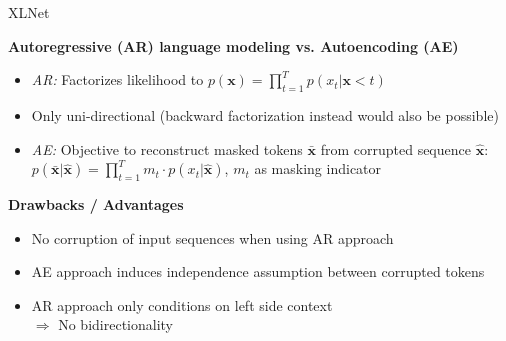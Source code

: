 \documentclass[]{beamer}
\begin{document}
\begin{frame}{XLNet \href{https://papers.nips.cc/paper/8812-xlnet-generalized-autoregressive-pretraining-for-language-understanding.pdf}{}}

	\textbf{Autoregressive (AR) language modeling vs. Autoencoding (AE)}
	
	\begin{itemize}
		\item \textit{AR:} Factorizes likelihood to $p(\mathbf{x}) = \prod_{t=1}^{T} p(x_t | \mathbf{x}{< t})$
		\item Only uni-directional (backward factorization instead would also be possible)
		\item \textit{AE:} Objective to reconstruct masked tokens $\bar{\mathbf{x}}$ from corrupted sequence $\hat{\mathbf{x}}$:
					$p(\bar{\mathbf{x}}|\hat{\mathbf{x}}) = \prod_{t=1}^{T} m_t \cdot p(x_t | \hat{\mathbf{x}})$, $m_t$ as masking indicator
	\end{itemize}

	\vspace{.3cm}
	
	\textbf{Drawbacks / Advantages}
	
	\begin{itemize}
		\item No corruption of input sequences when using AR approach
		\item AE approach induces independence assumption between corrupted tokens
		\item AR approach only conditions on left side context\\$\Rightarrow$ No bidirectionality
	\end{itemize}
\end{frame}
\end{document}
